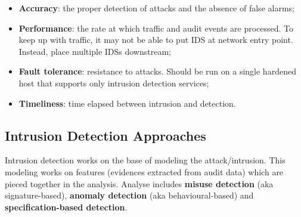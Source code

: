 \documentclass[a4paper, 10pt, titlepage]{article}
\begin{document}
\begin{itemize}
	\item \textbf{Accuracy}: the proper detection of attacks and the absence of false alarms;
	\item \textbf{Performance}: the rate at which traffic and audit events are processed. To keep up with traffic, it may not be able to put IDS at network entry point. Instead, place multiple IDSs downstream;
	\item \textbf{Fault tolerance}: resistance to attacks. Should be run on a single hardened host that supports only intrusion detection services;
	\item \textbf{Timeliness}: time elapsed between intrusion and detection.
\end{itemize}

\subsection{Intrusion Detection Approaches}
Intrusion detection works on the base of modeling the attack/intrusion. This modeling works on features (evidences extracted from audit data) which are pieced together in the analysis. Analyse includes \textbf{misuse detection} (aka signature-based), \textbf{anomaly detection} (aka behavioural-based) and \textbf{specification-based detection}.
\end{document}
